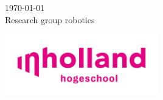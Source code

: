 \documentclass[12pt]{scrreprt}
\begin{document}
\begin{titlepage}


{\large \today}\\[2cm] %


 

\Large Research group robotics

\begin{center}
    \includegraphics[width=0.5\textwidth]{Figures/inholland.jpg}
\end{center}

\vfill %
\end{titlepage}

%
%
%
%
%
%
%
%
%
%
%
\end{document}
